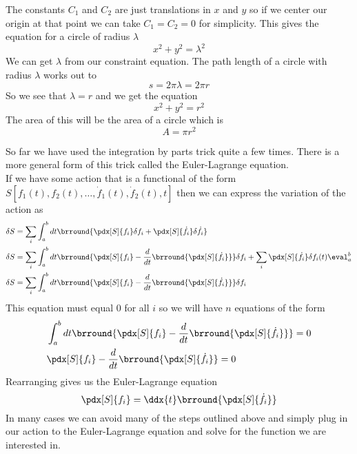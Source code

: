 The constants $C_1$ and $C_2$ are just translations in $x$ and $y$ so if we center our origin at that point we can take $C_1=C_2=0$ for simplicity. This gives the equation for a circle of radius $\lambda$
\[ x^2+y^2=\lambda^2 \]
We can get $\lambda$ from our constraint equation. The path length of a circle with radius $\lambda$ works out to
\[ s=2\pi\lambda=2\pi r \]
So we see that $\lambda=r$ and we get the equation
\[ x^2+y^2=r^2 \]
The area of this will be the area of a circle which is
\[ A=\pi r^2 \]

So far we have used the integration by parts trick quite a few times. There is a more general form of this trick called the Euler-Lagrange equation.\\
If we have some action that is a functional of the form $S[f_1(t),f_2(t),\ldots,\dot{f}_1(t),\dot{f}_2(t),t]$ then we can express the variation of the action as
\begin{align*}
    &\delta S=\sum_{i}\int_a^bdt\brround{\pdx[S]{f_i}\delta f_i+\pdx[S]{\dot{f}_i}\delta\dot{f}_i}\\
    &\delta S=\sum_{i}\int_a^bdt\brround{\pdx[S]{f_i}-\frac{d}{dt}\brround{\pdx[S]{\dot{f}_i}}}\delta f_i+\sum_i\pdx[S]{\dot{f}_i}\delta f_i(t)\eval_a^b\\
    &\delta S=\sum_{i}\int_a^bdt\brround{\pdx[S]{f_i}-\frac{d}{dt}\brround{\pdx[S]{\dot{f}_i}}}\delta f_i
\end{align*}
This equation must equal 0 for all $i$ so we will have $n$ equations of the form
\begin{align*}
    &\int_a^bdt\brround{\pdx[S]{f_i}-\frac{d}{dt}\brround{\pdx[S]{\dot{f}_i}}}=0\\
    &\pdx[S]{f_i}-\frac{d}{dt}\brround{\pdx[S]{\dot{f}_i}}=0
\end{align*}
Rearranging gives us the Euler-Lagrange equation
$$\pdx[S]{f_i}=\ddx{t}\brround{\pdx[S]{\dot{f}_i}}$$
In many cases we can avoid many of the steps outlined above and simply plug in our action to the Euler-Lagrange equation and solve for the function we are interested in.